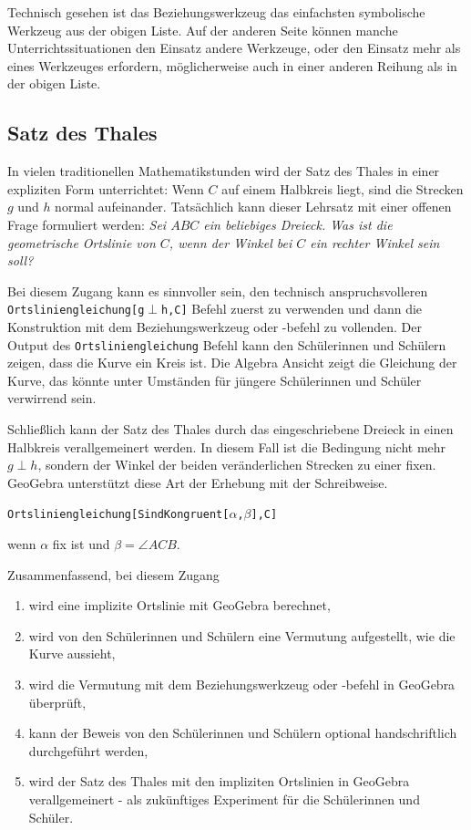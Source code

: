 \documentclass{article}
\begin{document}
Technisch gesehen ist das Beziehungswerkzeug das einfachsten symbolische Werkzeug aus der obigen Liste. Auf der anderen Seite können manche Unterrichtssituationen den Einsatz andere Werkzeuge, oder den Einsatz mehr als eines Werkzeuges erfordern, möglicherweise auch in einer anderen Reihung als in der obigen Liste.

\subsection{Satz des Thales}

In vielen traditionellen Mathematikstunden wird der Satz des Thales in einer expliziten Form unterrichtet: Wenn $C$ auf einem Halbkreis liegt, sind die Strecken $g$ und $h$ normal aufeinander. Tatsächlich kann dieser Lehrsatz mit einer offenen Frage formuliert werden: \textit{Sei $ABC$ ein beliebiges Dreieck. Was ist die geometrische Ortslinie von $C$, wenn der Winkel bei $C$ ein rechter Winkel sein soll?}

Bei diesem Zugang kann es sinnvoller sein, den technisch anspruchsvolleren \texttt{Ortsliniengleichung[g$\perp$h,C]} Befehl zuerst zu verwenden und dann die Konstruktion mit dem Beziehungswerkzeug oder -befehl zu vollenden. Der Output des   \texttt{Ortsliniengleichung} Befehl kann den Schülerinnen und Schülern zeigen, dass die Kurve ein Kreis ist. Die Algebra Ansicht zeigt die Gleichung der Kurve, das könnte unter Umständen für jüngere Schülerinnen und Schüler verwirrend sein.

Schließlich kann der Satz des Thales durch das eingeschriebene Dreieck in einen Halbkreis verallgemeinert werden. In diesem Fall ist die Bedingung nicht mehr $g\perp h$, sondern der Winkel der beiden veränderlichen Strecken zu einer fixen. GeoGebra unterstützt diese Art der Erhebung mit der Schreibweise.
\begin{center}
\texttt{Ortsliniengleichung[SindKongruent[$\alpha$,$\beta$],C]}
\end{center}
wenn $\alpha$ fix ist und $\beta=\angle{ACB}$.

Zusammenfassend, bei diesem Zugang
\begin{enumerate}
    \item wird eine implizite Ortslinie mit GeoGebra berechnet,
    \item wird von den Schülerinnen und Schülern eine Vermutung aufgestellt, wie die Kurve aussieht,
    \item wird die Vermutung mit dem Beziehungswerkzeug oder -befehl in GeoGebra überprüft,
    \item kann der Beweis von den Schülerinnen und Schülern optional handschriftlich durchgeführt werden,
    \item wird der Satz des Thales mit den impliziten Ortslinien in GeoGebra verallgemeinert - als zukünftiges Experiment für die Schülerinnen und Schüler.
\end{enumerate}
\end{document}
